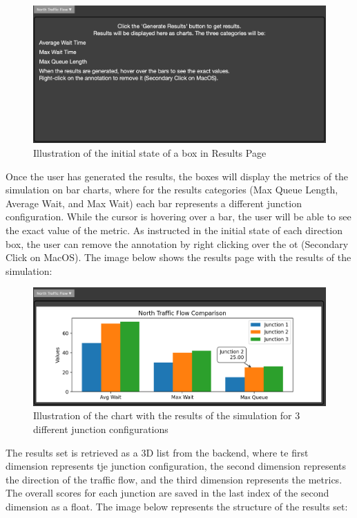 \documentclass{article}
\begin{document}
    \begin{figure}[H]
        \centering
        \includegraphics[width=\textwidth]{results1}
        \caption{Illustration of the initial state of a box in Results Page}
        \label{fig:results1}
    \end{figure}

    Once the user has generated the results, the boxes will display the metrics of the simulation on bar charts, where for the results categories (Max Queue Length, Average Wait, and Max Wait)
    each bar represents a different junction configuration. While the cursor is hovering over a bar, the user will be able to see the exact value of the metric. As instructed in the initial state
    of each direction box, the user can remove the annotation by right clicking over the ot (Secondary Click on MacOS). The image below shows the results page with the results of the simulation:

    \begin{figure}[H]
        \centering
        \includegraphics[width=\textwidth]{results2}
        \caption{Illustration of the chart with the results of the simulation for 3 different junction configurations}
        \label{fig:results2}
    \end{figure}

    The results set is retrieved as a 3D list from the backend, where te first dimension represents tje junction configuration, the second dimension represents the direction of the traffic flow, and the third dimension represents the metrics. The overall scores
    for each junction are saved in the last index of the second dimension as a float.
    The image below represents the structure of the results set:
\end{document}
